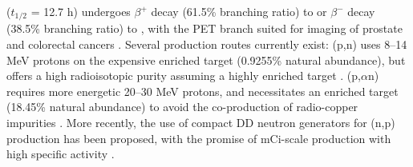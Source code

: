   ($t_{1/2}$ = 12.7 h) undergoes $\beta^+$ decay (61.5\% branching ratio) to  or $\beta^-$ decay (38.5\% branching ratio) to  \cite{Singh2007}, with the 
PET branch 
suited for imaging of prostate and colorectal cancers  
\cite{Lewis2003,Bandari2014,mp500671j}.
Several production routes currently exist: (p,n)  uses 8--14 MeV protons on the expensive enriched target  (0.9255\% natural abundance), but offers a high radioisotopic purity assuming a highly enriched target \cite{Szelecsenyi1993,Aslam2009}.
(p,$\alpha$n) requires more energetic 20--30 MeV protons, and necessitates an enriched target (18.45\% natural abundance) to avoid the co-production of radio-copper impurities \cite{Hilgers2003,Szelecsenyi2005}.
More recently, the use of compact DD neutron generators for (n,p) production has been proposed, with the promise of mCi-scale production with high specific activity  \cite{Voyles2017}.



